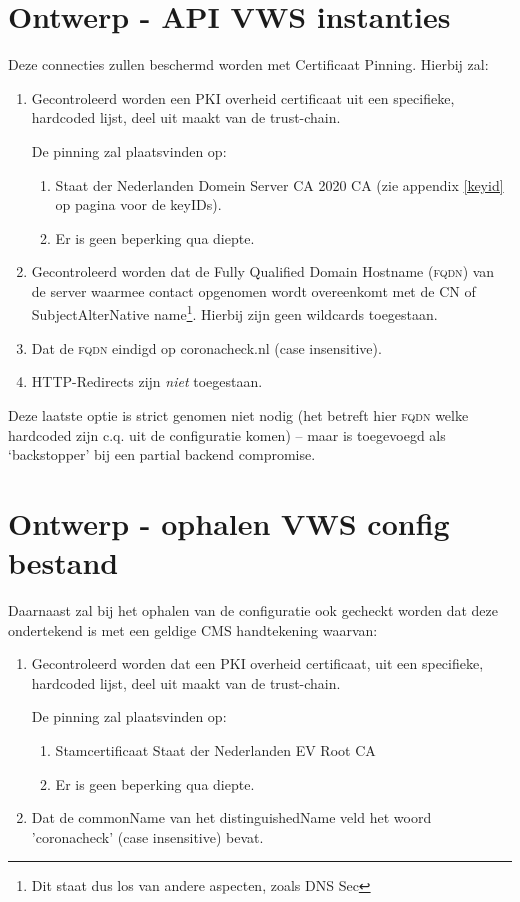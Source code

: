 \documentclass[11.0pt,twoside,openright]{report}
\begin{document}
\ifdefined\testsonly
\else
\pagebreak
\section{Ontwerp - API VWS instanties}
\label{api}

Deze connecties zullen beschermd worden met Certificaat Pinning. Hierbij zal:

\begin{enumerate}
\item	Gecontroleerd worden een PKI overheid certificaat uit een specifieke, hardcoded lijst, deel uit maakt van de trust-chain.

De pinning zal plaatsvinden op:
\begin{enumerate}
\item Staat der Nederlanden Domein Server CA 2020 CA (zie appendix \ref{keyid} op pagina \pageref{keyid} voor de keyIDs).
\item Er is geen beperking qua diepte.
\end{enumerate}
\item 	Gecontroleerd worden dat de Fully Qualified Domain Hostname (\textsc{fqdn}) van de server waarmee contact opgenomen wordt overeenkomt met de CN of SubjectAlterNative name\footnote{Dit staat dus los van andere aspecten, zoals DNS Sec}. Hierbij zijn geen wildcards toegestaan. 
\item 	Dat de \textsc{fqdn} eindigd op coronacheck.nl (case insensitive).
\item HTTP-Redirects zijn \emph{niet} toegestaan.
\end{enumerate}

Deze laatste optie is strict genomen niet nodig (het betreft hier \textsc{fqdn} welke hardcoded zijn c.q. uit de configuratie komen) -- maar is toegevoegd als `backstopper' bij een partial backend compromise.

\section{Ontwerp - ophalen VWS config bestand}
\label{config}

Daarnaast zal bij het ophalen van de configuratie ook gecheckt worden dat deze ondertekend is met een geldige CMS handtekening waarvan:

\begin{enumerate}
\item	Gecontroleerd worden dat een PKI overheid certificaat, uit een specifieke, hardcoded lijst, deel uit maakt van de trust-chain.

De pinning zal plaatsvinden op:
\begin{enumerate}
\item Stamcertificaat Staat der Nederlanden EV Root CA
\item Er is geen beperking qua diepte.
\end{enumerate}
\item	Dat de commonName van het distinguishedName veld het woord 'coronacheck' (case insensitive) bevat.
\end{enumerate}
\end{document}
